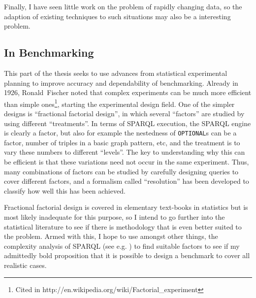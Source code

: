 \documentclass{llncs}
\begin{document}
Finally, I have seen little work on the problem of rapidly changing
data, so the adaption of existing techniques to such situations may
also be a interesting problem.


\subsection{In Benchmarking}\label{sec:benchmethod}

This part of the thesis seeks to use advances from statistical
experimental planning to improve accuracy and dependability of
benchmarking. Already in 1926, Ronald~Fischer noted that complex
experiments can be much more efficient than simple ones\footnote{Cited
  in http://en.wikipedia.org/wiki/Factorial\_experiment}, starting the
experimental design field. One of the simpler designs is ``fractional
factorial design'', in which several ``factors'' are studied by using
different ``treatments''. In terms of SPARQL execution, the SPARQL
engine is clearly a factor, but also for example the nestedness of
\texttt{OPTIONAL}s can be a factor, number of triples in a basic graph
pattern, etc, and the treatment is to vary these numbers to different
``levels''. The key to understanding why this can be efficient is that
these variations need not occur in the same experiment. Thus, many
combinations of factors can be studied by carefully designing queries
to cover different factors, and a formalism called ``resolution'' has
been developed to classify how well this has been achieved.

Fractional factorial design is covered in elementary text-books in
statistics but is most likely inadequate for this purpose, so I
intend to go further into the statistical literature to see if there
is methodology that is even better suited to the problem. Armed with
this, I hope to use amongst other things, the complexity analysis of
SPARQL (see e.g. \cite{Schmidt:2010:FSQ:1804669.1804675}) to find
suitable factors to see if my admittedly bold proposition that it is
possible to design a benchmark to cover all realistic cases.


%

%

\end{document}

